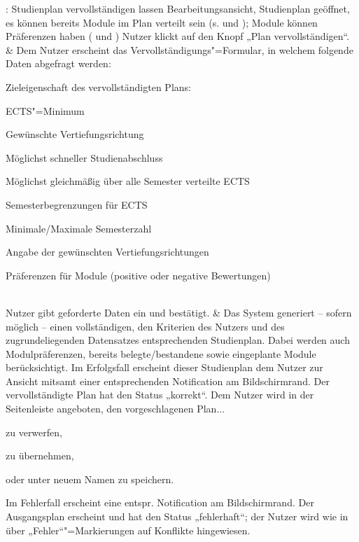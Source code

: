 \begin{usecase}{: Studienplan vervollständigen lassen}
	{Bearbeitungsansicht, Studienplan geöffnet, es können bereits Module im Plan verteilt sein (s.  und ); Module können Präferenzen haben ( und )}
	Nutzer klickt auf den Knopf „Plan vervollständigen“.
	& Dem Nutzer erscheint das Vervollständigungs"=Formular, in welchem folgende Daten abgefragt werden:
	\begin{tblitemize}
		\item Zieleigenschaft des vervollständigten Plans:
		\begin{tblitemize}
			\item ECTS"=Minimum
			\item Gewünschte Vertiefungsrichtung
			\item Möglichst schneller Studienabschluss
			\item Möglichst gleichmäßig über alle Semester verteilte ECTS
		\end{tblitemize}
		\item Semesterbegrenzungen für ECTS
		\item Minimale/Maximale Semesterzahl
		\item Angabe der gewünschten Vertiefungsrichtungen
		\item Präferenzen für Module (positive oder negative Bewertungen)
	\end{tblitemize} \\
	\hline
	Nutzer gibt geforderte Daten ein und bestätigt.
	& Das System generiert – sofern möglich – einen vollständigen, den Kriterien des Nutzers und des zugrundeliegenden Datensatzes entsprechenden Studienplan. Dabei werden auch Modulpräferenzen, bereits belegte/bestandene sowie eingeplante Module berücksichtigt. \newline
	Im Erfolgsfall erscheint dieser Studienplan dem Nutzer zur Ansicht mitsamt einer entsprechenden Notification am Bildschirmrand. Der vervollständigte Plan hat den Status „korrekt“. Dem Nutzer wird in der Seitenleiste angeboten, den vorgeschlagenen Plan...
	\begin{tblitemize}
		\item zu verwerfen,
		\item zu übernehmen,
		\item oder unter neuem Namen zu speichern.
	\end{tblitemize} \newline
	Im Fehlerfall erscheint eine entspr. Notification am Bildschirmrand. Der Ausgangsplan erscheint und hat den Status „fehlerhaft“; der Nutzer wird wie in  über „Fehler“"=Markierungen auf Konflikte hingewiesen. \\

\end{usecase}
